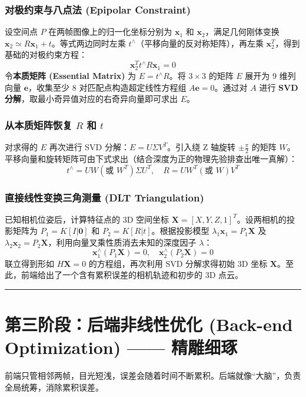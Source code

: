 \documentclass[12pt,a4paper]{article}
\begin{document}
\subsubsection{对极约束与八点法 (Epipolar Constraint)}
设空间点 $P$ 在两帧图像上的归一化坐标分别为 $\mathbf{x}_1$ 和 $\mathbf{x}_2$，满足几何刚体变换 $\mathbf{x}_2 \simeq R \mathbf{x}_1 + t$。等式两边同时左乘 $t^{\wedge}$（平移向量的反对称矩阵），再左乘 $\mathbf{x}_2^T$，得到基础的对极约束方程：
\begin{equation}
    \mathbf{x}_2^T t^{\wedge} R \mathbf{x}_1 = 0
\end{equation}
令\textbf{本质矩阵 (Essential Matrix)} 为 $E = t^{\wedge} R$。将 $3 \times 3$ 的矩阵 $E$ 展开为 9 维列向量 $\mathbf{e}$，收集至少 8 对匹配点构造超定线性方程组 $A \mathbf{e} = 0$。通过对 $A$ 进行 \textbf{SVD 分解}，取最小奇异值对应的右奇异向量即可求出 $E$。

\subsubsection{从本质矩阵恢复 $R$ 和 $t$}
对求得的 $E$ 再次进行 SVD 分解：$E = U \Sigma V^T$。引入绕 Z 轴旋转 $\pm \frac{\pi}{2}$ 的矩阵 $W$。平移向量和旋转矩阵可由下式求出（结合深度为正的物理先验排查出唯一真解）：
\begin{equation}
    t^{\wedge} = U W (\text{或 } W^T) \Sigma U^T, \quad R = U W^T (\text{或 } W) V^T
\end{equation}

\subsubsection{直接线性变换三角测量 (DLT Triangulation)}
已知相机位姿后，计算特征点的 3D 空间坐标 $\mathbf{X} = [X, Y, Z, 1]^T$。设两相机的投影矩阵为 $P_1 = K [I | \mathbf{0}]$ 和 $P_2 = K [R | t]$。根据投影模型 $\lambda_1 \mathbf{x}_1 = P_1 \mathbf{X}$ 及 $\lambda_2 \mathbf{x}_2 = P_2 \mathbf{X}$，利用向量叉乘性质消去未知的深度因子 $\lambda$：
\begin{equation}
    \mathbf{x}_1^{\wedge} (P_1 \mathbf{X}) = 0, \quad \mathbf{x}_2^{\wedge} (P_2 \mathbf{X}) = 0
\end{equation}
联立得到形如 $H \mathbf{X} = 0$ 的方程组，再次利用 SVD 分解求得初始 3D 坐标 $\mathbf{X}$。至此，前端给出了一个含有累积误差的相机轨迹和初步的 3D 点云。

\vspace{0.5cm}
\hrule
\vspace{0.5cm}

\section{第三阶段：后端非线性优化 (Back-end Optimization) —— 精雕细琢}
前端只管相邻两帧，目光短浅，误差会随着时间不断累积。后端就像“大脑”，负责全局统筹，消除累积误差。
\end{document}

